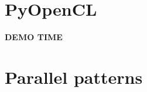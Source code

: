 \documentclass[english,compress]{beamer}
\def\bigncentered#1{
  \begin{center}
    \Huge\bfseries #1
  \end{center}
}
\begin{document}
%

%
%

\section{PyOpenCL}
\begin{frame}
  \bigncentered{DEMO TIME}
\end{frame}
\section[Patterns]{Parallel patterns}
\end{document}
